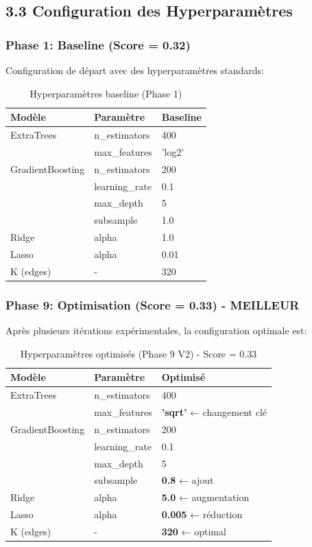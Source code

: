 \documentclass[12pt,a4paper,french]{article}
\begin{document}
\subsection{3.3 Configuration des Hyperparamètres}

\subsubsection{Phase 1: Baseline (Score = 0.32)}

Configuration de départ avec des hyperparamètres standards:

\begin{table}[H]
\centering
\begin{tabular}{lll}
\toprule
\textbf{Modèle} & \textbf{Paramètre} & \textbf{Baseline} \\
\midrule
ExtraTrees & n\_estimators & 400 \\
& max\_features & 'log2' \\
GradientBoosting & n\_estimators & 200 \\
& learning\_rate & 0.1 \\
& max\_depth & 5 \\
& subsample & 1.0 \\
Ridge & alpha & 1.0 \\
Lasso & alpha & 0.01 \\
K (edges) & - & 320 \\
\bottomrule
\end{tabular}
\caption{Hyperparamètres baseline (Phase 1)}
\end{table}

\subsubsection{Phase 9: Optimisation (Score = 0.33) - MEILLEUR}

Après plusieurs itérations expérimentales, la configuration optimale est:

\begin{table}[H]
\centering
\begin{tabular}{lll}
\toprule
\textbf{Modèle} & \textbf{Paramètre} & \textbf{Optimisé} \\
\midrule
ExtraTrees & n\_estimators & 400 \\
& max\_features & \textbf{'sqrt'} ← changement clé \\
GradientBoosting & n\_estimators & 200 \\
& learning\_rate & 0.1 \\
& max\_depth & 5 \\
& subsample & \textbf{0.8} ← ajout \\
Ridge & alpha & \textbf{5.0} ← augmentation \\
Lasso & alpha & \textbf{0.005} ← réduction \\
K (edges) & - & \textbf{320} ← optimal \\
\bottomrule
\end{tabular}
\caption{Hyperparamètres optimisés (Phase 9 V2) - Score = 0.33}
\end{table}
\end{document}
